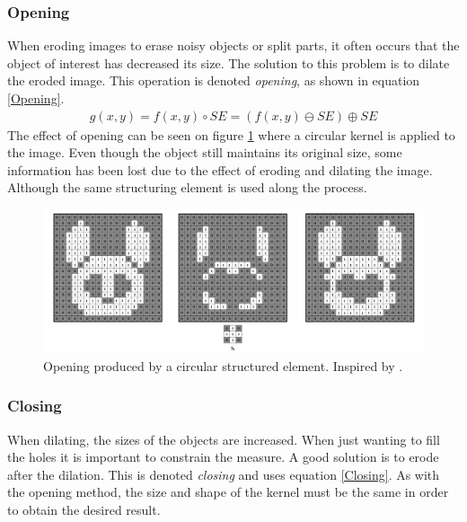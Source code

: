 \subsubsection{Opening}
When eroding images to erase noisy objects or split parts, it often occurs that the object of interest has decreased its size. The solution to this problem is to dilate the eroded image. This operation is denoted \textit{opening}, as shown in equation \ref{Opening}.
\begin{equation}
\begin{aligned}
{g(x,y)}={f(x,y)}\circ{SE}=({f(x,y)}\ominus{SE})\oplus{SE}
\label{Opening}
	\end{aligned}
\end{equation}
The effect of opening can be seen on figure \ref{fig:Opening} where a circular kernel is applied to the image. Even though the object still maintains its original size, some information has been lost due to the effect of eroding and dilating the image. Although the same structuring element is used along the process.

\begin{figure}[htbp]
\centering
\includegraphics[width=1\textwidth]{Pictures/Theory/OpeningCirc.png}
\caption{Opening produced by a circular structured element. Inspired by \citep{ip_book}.}
\label{fig:Opening}
\end{figure}

\subsubsection{Closing}\label{closing}
When dilating, the sizes of the objects are increased. When just wanting to fill the holes it is important to constrain the measure. A good solution is to erode after the dilation. This is denoted \textit{closing} and uses equation \ref{Closing}. As with the opening method, the size and shape of the kernel must be the same in order to obtain the desired result.

